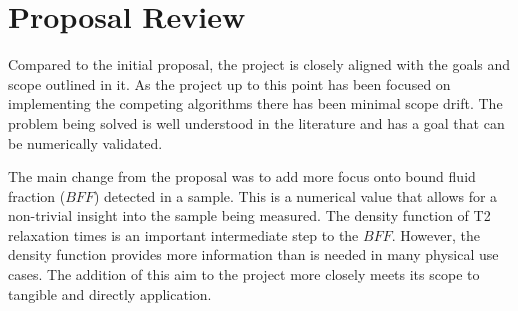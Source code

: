 \section{Proposal Review}
Compared to the initial proposal, the project is closely aligned with the goals and scope outlined in it. As the project up to this point has been focused on implementing the competing algorithms there has been minimal scope drift. The problem being solved is well understood in the literature and has a goal that can be numerically validated. 


The main change from the proposal was to add more focus onto bound fluid fraction ($BFF$) detected in a sample. This is a numerical value that allows for a non-trivial insight into the sample being measured. The density function of T2 relaxation times is an important intermediate step to the $BFF$. However, the density function provides more information than is needed in many physical use cases. The addition of this aim to the project more closely meets its scope to tangible and directly application.

 

